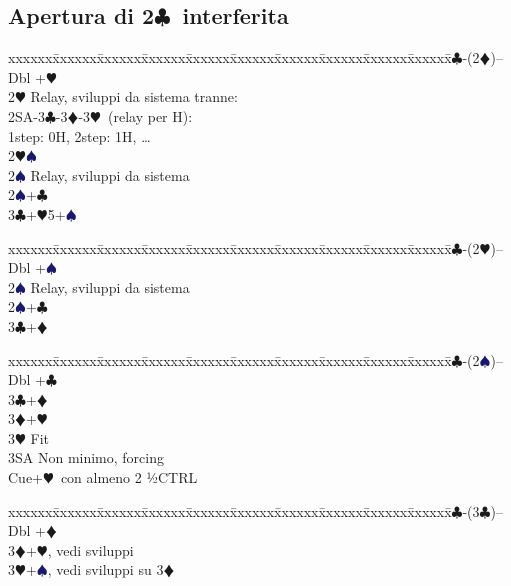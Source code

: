 \documentclass[a4paper,italian]{article}
\newcommand{\BC}{\textcolor{OliveGreen}{$\clubsuit$}}
\newcommand{\BD}{\textcolor{RedOrange}{$\vardiamondsuit$}}
\newcommand{\BH}{\textcolor{Red2}{$\varheartsuit${}}}
\newcommand{\BS}{\textcolor{MidnightBlue}{$\spadesuit${}}}
\newcommand{\pdfc}{\texorpdfstring{\BC{}}{C}}
\newenvironment{bidtable}
{\begin{tabbing}

    xxxxxx\=xxxxxx\=xxxxxx\=xxxxxx\=xxxxxx\=xxxxxx\=xxxxxx\=xxxxxx\=xxxxxx\=xxxxxx\=\kill}
{\end{tabbing} }%
\begin{document}
\begin{multicols}{2}

    \subsection{Apertura di 2\pdfc\ interferita}

    \begin{bidtable}
        2\BC-(2\BD)--\+\\
        Dbl +\BH\+\\
        2\BH\> Relay, sviluppi da sistema tranne:
        \+\\
        2SA-3\BC-3\BD-3\BH\ (relay per H):\\
        1step: 0H, 2step: 1H, \dots\-\-\\
        2\BH{}\BS\+\\
        2\BS\> Relay, sviluppi da sistema\-\\
        2\BS{}+\BC\\
        3\BC{}+\BH5+\BS\\
    \end{bidtable}
    \begin{bidtable}
        2\BC-(2\BH)--\+\\
        Dbl +\BS\+\\
        2\BS\> Relay, sviluppi da sistema\-\\
        2\BS{}+\BC\\
        3\BC{}+\BD\\
    \end{bidtable}
    \begin{bidtable}
        2\BC-(2\BS)--\+\\
        Dbl +\BC\\
        3\BC{}+\BD\\
        3\BD {}+\BH\+\\
        3\BH\> Fit\+\\
        3SA\> Non minimo, forcing\\
        Cue+\BH\ con almeno 2 ½CTRL\-\-\\
    \end{bidtable}
    \begin{bidtable}
        2\BC-(3\BC)--\+\\
        Dbl +\BD\\
        3\BD {}+\BH, vedi sviluppi\\
        3\BH {}+\BS, vedi sviluppi su 3\BD\\
    \end{bidtable}

\end{multicols}
\end{document}
